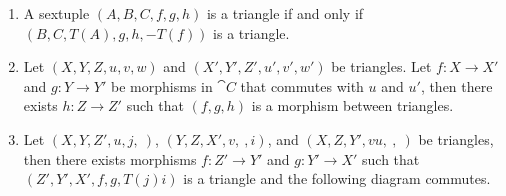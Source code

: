 \begin{definition}
\begin{enumerate}
        \item A sextuple $(A,B,C,f,g,h)$ is a triangle if and only if $(B,C,T(A),g,h,-T(f))$ is a triangle.
        \item Let $(X,Y,Z,u,v,w)$ and $(X',Y',Z',u',v',w')$ be triangles. Let $f:X\to X'$ and $g:Y\to Y'$ be morphisms in $\cat{C}$ that commutes with $u$ and $u'$, then there exists $h:Z\to Z'$ such that $(f,g,h)$ is a morphism between triangles.
        \begin{center}
        \end{center}
        \item Let $(X,Y,Z',u,j,\ )$, $(Y,Z,X',v,\ ,i)$, and $(X,Z,Y',vu,\ ,\ )$ be triangles, then there exists morphisms $f:Z'\to Y'$ and $g:Y'\to X'$ such that $(Z',Y',X',f,g,T(j)i)$ is a triangle and the following diagram commutes.
        \begin{center}
            \hspace{2.5cm}
        \end{center}

\end{enumerate}
\end{definition}
